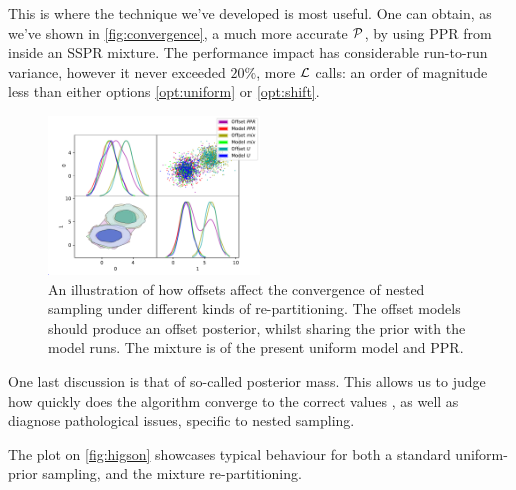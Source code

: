 \documentclass[usenatbib]{mnras}
\begin{document}
This is where the technique we've developed is most useful. One can
obtain, as we've shown in \autoref{fig:convergence}, a much more
accurate \({\cal P}\), by using PPR from inside an SSPR mixture. The
performance impact has considerable run-to-run variance, however it
never exceeded \(20\%\), more \({\cal L}\) calls: an order of magnitude
less than either options \ref{opt:uniform} or \ref{opt:shift}. 

\begin{figure}
\includegraphics[width=0.5\textwidth]{./illustrations/convergence.pdf}
\caption{\label{org3a2aed2}
An illustration of how offsets affect the convergence of nested sampling under different kinds of re-partitioning. The offset models should produce an offset posterior, whilst sharing the prior with the model runs. The mixture is of the present uniform model and PPR.}
\end{figure}



One last discussion is that of so-called posterior mass. This allows
us to judge how quickly does the algorithm converge to the correct
values \cite{higson2018nestcheck}, as well as diagnose pathological
issues, specific to nested sampling. 

The plot on \autoref{fig:higson} showcases typical behaviour for
both a standard uniform-prior sampling, and the mixture
re-partitioning. 
\end{document}
